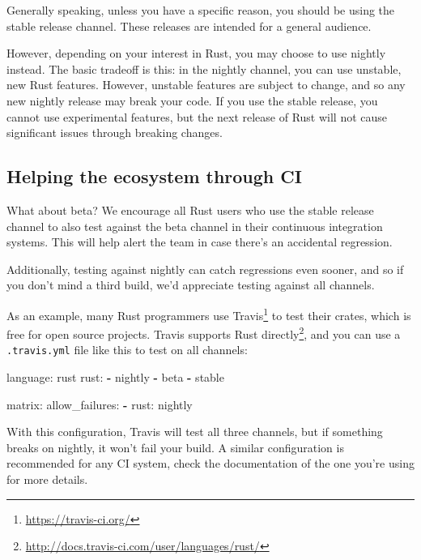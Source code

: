 \documentclass[a4paper,]{book}
\newenvironment{Shaded}{\begin{snugshade}}{\end{snugshade}}
\newcommand{\KeywordTok}[1]{\textcolor[rgb]{0.13,0.29,0.53}{\textbf{{#1}}}}
\newcommand{\FunctionTok}[1]{\textcolor[rgb]{0.00,0.00,0.00}{{#1}}}
\newcommand{\NormalTok}[1]{{#1}}
\renewcommand{\href}[2]{#2\footnote{\url{#1}}}
\begin{document}
Generally speaking, unless you have a specific reason, you should be
using the stable release channel. These releases are intended for a
general audience.

However, depending on your interest in Rust, you may choose to use
nightly instead. The basic tradeoff is this: in the nightly channel, you
can use unstable, new Rust features. However, unstable features are
subject to change, and so any new nightly release may break your code.
If you use the stable release, you cannot use experimental features, but
the next release of Rust will not cause significant issues through
breaking changes.

\subsection{Helping the ecosystem through
CI}\label{helping-the-ecosystem-through-ci}

What about beta? We encourage all Rust users who use the stable release
channel to also test against the beta channel in their continuous
integration systems. This will help alert the team in case there's an
accidental regression.

Additionally, testing against nightly can catch regressions even sooner,
and so if you don't mind a third build, we'd appreciate testing against
all channels.

As an example, many Rust programmers use
\href{https://travis-ci.org/}{Travis} to test their crates, which is
free for open source projects. Travis
\href{http://docs.travis-ci.com/user/languages/rust/}{supports Rust
directly}, and you can use a \texttt{.travis.yml} file like this to test
on all channels:

\begin{Shaded}
\begin{Highlighting}[]
\FunctionTok{language:} \NormalTok{rust}
\FunctionTok{rust:}
  \KeywordTok{-} \NormalTok{nightly}
  \KeywordTok{-} \NormalTok{beta}
  \KeywordTok{-} \NormalTok{stable}

\FunctionTok{matrix:}
  \FunctionTok{allow_failures:}
    \KeywordTok{-} \FunctionTok{rust:} \NormalTok{nightly}
\end{Highlighting}
\end{Shaded}

With this configuration, Travis will test all three channels, but if
something breaks on nightly, it won't fail your build. A similar
configuration is recommended for any CI system, check the documentation
of the one you're using for more details.
\end{document}
